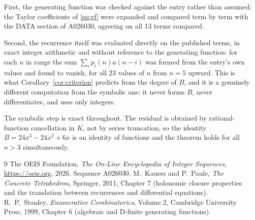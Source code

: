 \documentclass[11pt,a4paper]{article}
\theoremstyle{plain}
\theoremstyle{definition}
\begin{document}
First, the generating function was checked against the entry rather than assumed: the
Taylor coefficients of \eqref{eq:gf} were expanded and compared term by term with the DATA
section of A026030, agreeing on all 13 terms compared.

Second, the recurrence itself was evaluated directly on the published terms, in exact
integer arithmetic and without reference to the generating function: for each $n$ in range
the sum $\sum_{i}p_{i}(n)a(n-i)$ was formed from the entry's own values and found to
vanish, for all 23 values of $n$ from $n=5$ upward. This is what
Corollary~\ref{cor:criterion} predicts from the degree of $B$, and it is a genuinely
different computation from the symbolic one: it never forms $B$, never differentiates, and
uses only integers.

The symbolic step is exact throughout. The residual is obtained by rational-function
cancellation in $K$, not by series truncation, so the identity $B=24 x^{3} - 24 x^{2} + 6 x$ is an
identity of functions and the theorem holds for all $n>3$ simultaneously.

\begin{thebibliography}{9}
 The OEIS Foundation, \emph{The On-Line Encyclopedia of Integer Sequences},
\url{https://oeis.org}, 2026. Sequence A026030.
 M.~Kauers and P.~Paule, \emph{The Concrete Tetrahedron}, Springer, 2011,
Chapter 7 (holonomic closure properties and the translation between recurrences and
differential equations).
 R.~P.~Stanley, \emph{Enumerative Combinatorics}, Volume 2, Cambridge
University Press, 1999, Chapter 6 (algebraic and D-finite generating functions).
\end{thebibliography}
\end{document}
